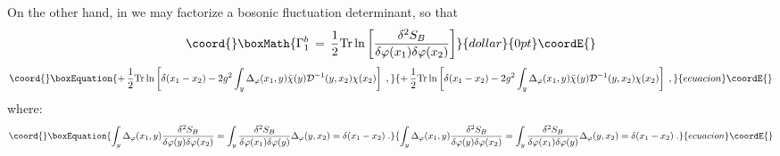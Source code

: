 \documentclass[a4paper,12pt]{article}
\begin{document}
On the other hand, in \coordHE{} we may factorize a bosonic fluctuation 
determinant, so that
$$\coord{}\boxMath{
\Gamma_1^b \,=\, \frac{1}{2} {\rm Tr} \ln \left[ \frac{\delta^2
    S_B}{\delta\varphi(x_1)\delta\varphi(x_2)}\right]
}{dollar}{0pt}\coordE{}$$
\begin{equation}\coord{}\boxEquation{
  \label{eq:gmb1}
+\, \frac{1}{2} {\rm Tr} \ln \left[ \delta(x_1-x_2) 
- 2 g^2 \int_y \Delta_\varphi(x_1,y) {\bar \chi}(y)
{\mathcal D}^{-1}(y,x_2) \chi(x_2) \right] \;,
}{
  +\, \frac{1}{2} {\rm Tr} \ln \left[ \delta(x_1-x_2) 
- 2 g^2 \int_y \Delta_\varphi(x_1,y) {\bar \chi}(y)
{\mathcal D}^{-1}(y,x_2) \chi(x_2) \right] \;,
}{ecuacion}\coordE{}\end{equation}
where:
\begin{equation}\coord{}\boxEquation{\label{eq:delphi}
\int_y \Delta_\varphi(x_1,y) \frac{\delta^2 S_B}{\delta\varphi(y)\delta\varphi(x_2)}=\int_y \frac{\delta^2 S_B}{\delta\varphi(x_1)\delta\varphi(y)}
\Delta_\varphi(y,x_2)=\delta(x_1-x_2) \;.
}{\int_y \Delta_\varphi(x_1,y) \frac{\delta^2 S_B}{\delta\varphi(y)\delta\varphi(x_2)}=\int_y \frac{\delta^2 S_B}{\delta\varphi(x_1)\delta\varphi(y)}
\Delta_\varphi(y,x_2)=\delta(x_1-x_2) \;.
}{ecuacion}\coordE{}\end{equation}
\end{document}

